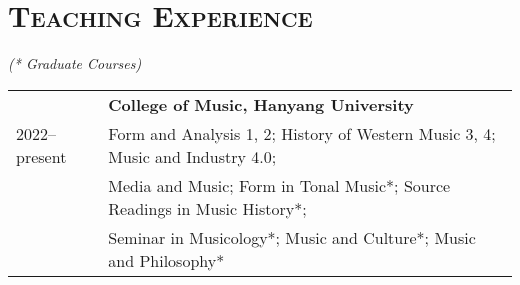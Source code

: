 \documentclass[a4paper,11pt,draft]{article}
\begin{document}
  \newpage
  \section*{\textsc{Teaching Experience}}
  \textit{(* Graduate Courses)}
  \vspace{5.0mm}
    
  \hspace*{-0.77cm}
  \begin{tabular}{p{2.5cm} l}
    & \textbf{College of Music, Hanyang University}\\
    2022–present & Form and Analysis 1, 2; History of Western Music 3, 4; Music and Industry 4.0;\\
    & Media and Music; Form in Tonal Music*; Source Readings in Music History*;\\
    & Seminar in Musicology*; Music and Culture*; Music and Philosophy*
  \end{tabular}
\end{document}
